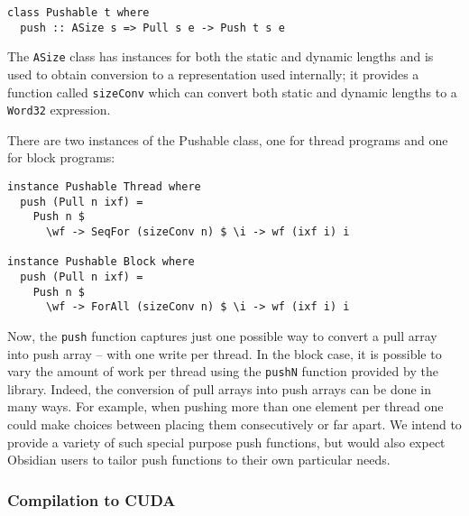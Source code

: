 \begin{small}
\begin{Verbatim}[samepage=true] 
class Pushable t where
  push :: ASize s => Pull s e -> Push t s e 
\end{Verbatim} 
\end{small}  

The {\tt ASize} class has instances for both the static and dynamic lengths 
and is used to obtain conversion to a representation used internally; it 
provides a function called {\tt sizeConv} which can convert both static and 
dynamic lengths to a {\tt Word32} expression.

  
There are two instances of the Pushable class, one for thread programs and 
one for block programs:

\begin{small}
\begin{Verbatim}[samepage=true] 
instance Pushable Thread where
  push (Pull n ixf) =
    Push n $ 
      \wf -> SeqFor (sizeConv n) $ \i -> wf (ixf i) i

instance Pushable Block where
  push (Pull n ixf) =
    Push n $ 
      \wf -> ForAll (sizeConv n) $ \i -> wf (ixf i) i
\end{Verbatim} 
\end{small}  

Now, the {\tt push} function captures just one possible way to convert 
a pull array into push array -- with one write
per thread. In the block case, it is possible to vary 
the amount of work per thread using the {\tt pushN} function provided
by the library. 
Indeed, the conversion of pull arrays into push arrays can be done in many ways. 
For example, when pushing more than one element per thread one could make 
choices between placing them consecutively or far apart.
We intend to provide a variety of such special purpose push functions,
but would also expect Obsidian users to tailor push functions to
their own particular needs.


\subsubsection{Compilation to CUDA}
\label{sec:Compile}

